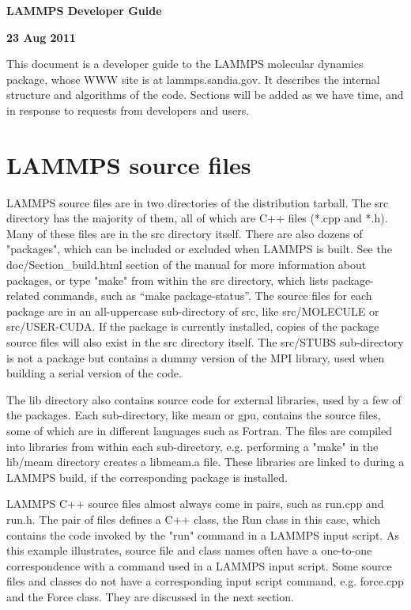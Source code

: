 \documentclass{article}
\begin{document}
\centerline{\Large \bf LAMMPS Developer Guide}
\centerline{\bf 23 Aug 2011}

\vspace{0.5in}

This document is a developer guide to the LAMMPS molecular dynamics
package, whose WWW site is at lammps.sandia.gov.  It describes the
internal structure and algorithms of the code.  Sections will be added
as we have time, and in response to requests from developers and
users.

\tableofcontents
\renewcommand\listoflistingscaption{List of source codes}
\listoflistings

\pagebreak
\section{LAMMPS source files}

LAMMPS source files are in two directories of the distribution
tarball.  The src directory has the majority of them, all of which are
C++ files (*.cpp and *.h).  Many of these files are in the src
directory itself.  There are also dozens of "packages", which can be
included or excluded when LAMMPS is built.  See the
doc/Section\_build.html section of the manual for more information
about packages, or type "make" from within the src directory, which
lists package-related commands, such as ``make package-status''.  The
source files for each package are in an all-uppercase sub-directory of
src, like src/MOLECULE or src/USER-CUDA.  If the package is currently
installed, copies of the package source files will also exist in the
src directory itself.  The src/STUBS sub-directory is not a package
but contains a dummy version of the MPI library, used when building a
serial version of the code.

The lib directory also contains source code for external libraries,
used by a few of the packages.  Each sub-directory, like meam or gpu,
contains the source files, some of which are in different languages
such as Fortran.  The files are compiled into libraries from within
each sub-directory, e.g. performing a "make" in the lib/meam directory
creates a libmeam.a file.  These libraries are linked to during a
LAMMPS build, if the corresponding package is installed.

LAMMPS C++ source files almost always come in pairs, such as run.cpp
and run.h.  The pair of files defines a C++ class, the Run class in
this case, which contains the code invoked by the "run" command in a
LAMMPS input script.  As this example illustrates, source file and
class names often have a one-to-one correspondence with a command used
in a LAMMPS input script.  Some source files and classes do not have a
corresponding input script command, e.g. force.cpp and the Force
class.  They are discussed in the next section.
\end{document}
